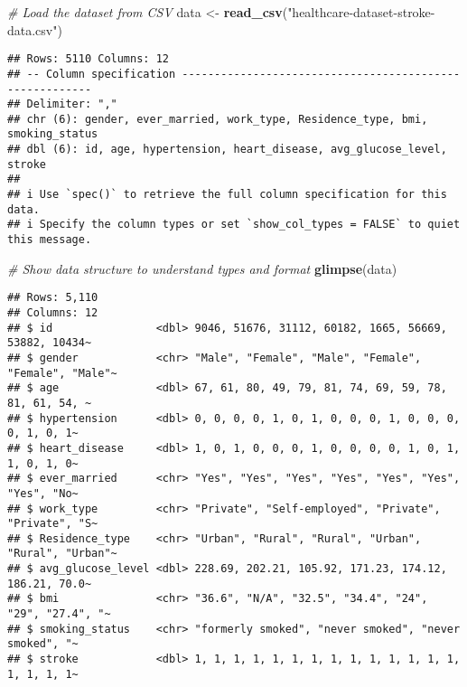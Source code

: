 \documentclass[
]{article}
\newenvironment{Shaded}{\begin{snugshade}}{\end{snugshade}}
\newcommand{\CommentTok}[1]{\textcolor[rgb]{0.56,0.35,0.01}{\textit{#1}}}
\newcommand{\FunctionTok}[1]{\textcolor[rgb]{0.13,0.29,0.53}{\textbf{#1}}}
\newcommand{\NormalTok}[1]{#1}
\newcommand{\OtherTok}[1]{\textcolor[rgb]{0.56,0.35,0.01}{#1}}
\newcommand{\StringTok}[1]{\textcolor[rgb]{0.31,0.60,0.02}{#1}}
\begin{document}
\begin{Shaded}
\begin{Highlighting}[]
\CommentTok{\# Load the dataset from CSV}
\NormalTok{data }\OtherTok{\textless{}{-}} \FunctionTok{read\_csv}\NormalTok{(}\StringTok{"healthcare{-}dataset{-}stroke{-}data.csv"}\NormalTok{)}
\end{Highlighting}
\end{Shaded}

\begin{verbatim}
## Rows: 5110 Columns: 12
## -- Column specification --------------------------------------------------------
## Delimiter: ","
## chr (6): gender, ever_married, work_type, Residence_type, bmi, smoking_status
## dbl (6): id, age, hypertension, heart_disease, avg_glucose_level, stroke
## 
## i Use `spec()` to retrieve the full column specification for this data.
## i Specify the column types or set `show_col_types = FALSE` to quiet this message.
\end{verbatim}

\begin{Shaded}
\begin{Highlighting}[]
\CommentTok{\# Show data structure to understand types and format}
\FunctionTok{glimpse}\NormalTok{(data)}
\end{Highlighting}
\end{Shaded}

\begin{verbatim}
## Rows: 5,110
## Columns: 12
## $ id                <dbl> 9046, 51676, 31112, 60182, 1665, 56669, 53882, 10434~
## $ gender            <chr> "Male", "Female", "Male", "Female", "Female", "Male"~
## $ age               <dbl> 67, 61, 80, 49, 79, 81, 74, 69, 59, 78, 81, 61, 54, ~
## $ hypertension      <dbl> 0, 0, 0, 0, 1, 0, 1, 0, 0, 0, 1, 0, 0, 0, 0, 1, 0, 1~
## $ heart_disease     <dbl> 1, 0, 1, 0, 0, 0, 1, 0, 0, 0, 0, 1, 0, 1, 1, 0, 1, 0~
## $ ever_married      <chr> "Yes", "Yes", "Yes", "Yes", "Yes", "Yes", "Yes", "No~
## $ work_type         <chr> "Private", "Self-employed", "Private", "Private", "S~
## $ Residence_type    <chr> "Urban", "Rural", "Rural", "Urban", "Rural", "Urban"~
## $ avg_glucose_level <dbl> 228.69, 202.21, 105.92, 171.23, 174.12, 186.21, 70.0~
## $ bmi               <chr> "36.6", "N/A", "32.5", "34.4", "24", "29", "27.4", "~
## $ smoking_status    <chr> "formerly smoked", "never smoked", "never smoked", "~
## $ stroke            <dbl> 1, 1, 1, 1, 1, 1, 1, 1, 1, 1, 1, 1, 1, 1, 1, 1, 1, 1~
\end{verbatim}
\end{document}
